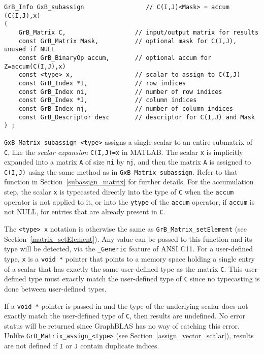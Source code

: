 \documentclass[12pt]{article}
\begin{document}
\begin{mdframed}[userdefinedwidth=6in]
{\footnotesize
\begin{verbatim}
GrB_Info GxB_subassign                 // C(I,J)<Mask> = accum (C(I,J),x)
(
    GrB_Matrix C,                   // input/output matrix for results
    const GrB_Matrix Mask,          // optional mask for C(I,J), unused if NULL
    const GrB_BinaryOp accum,       // optional accum for Z=accum(C(I,J),x)
    const <type> x,                 // scalar to assign to C(I,J)
    const GrB_Index *I,             // row indices
    const GrB_Index ni,             // number of row indices
    const GrB_Index *J,             // column indices
    const GrB_Index nj,             // number of column indices
    const GrB_Descriptor desc       // descriptor for C(I,J) and Mask
) ;
\end{verbatim} } \end{mdframed}

\verb'GxB_Matrix_subassign_<type>' assigns a single scalar to an entire
submatrix of \verb'C', like the {\em scalar expansion} \verb'C(I,J)=x' in
MATLAB.  The scalar \verb'x' is implicitly expanded into a matrix \verb'A' of
size \verb'ni' by \verb'nj', and then the matrix \verb'A' is assigned to
\verb'C(I,J)' using the same method as in \verb'GxB_Matrix_subassign'.  Refer
to that function in Section~\ref{subassign_matrix} for further details.
For the accumulation step, the scalar \verb'x' is typecasted directly into the
type of \verb'C' when the \verb'accum' operator is not applied to it, or into
the \verb'ytype' of the \verb'accum' operator, if \verb'accum' is not NULL, for
entries that are already present in \verb'C'.

The \verb'<type> x' notation is otherwise the same as
\verb'GrB_Matrix_setElement' (see Section~\ref{matrix_setElement}).  Any value
can be passed to this function and its type will be detected, via the
\verb'_Generic' feature of ANSI C11.  For a user-defined type, \verb'x' is a
\verb'void *' pointer that points to a memory space holding a single entry of a
scalar that has exactly the same user-defined type as the matrix \verb'C'.
This user-defined type must exactly match the user-defined type of \verb'C'
since no typecasting is done between user-defined types.

If a \verb'void *' pointer is passed in and the type of the underlying scalar
does not exactly match the user-defined type of \verb'C', then results are
undefined.  No error status will be returned since GraphBLAS has no way of
catching this error.
Unlike \verb'GrB_Matrix_assign_<type>' (see
Section~\ref{assign_vector_scalar}), results are not defined if \verb'I' or
\verb'J' contain duplicate indices.
\end{document}
